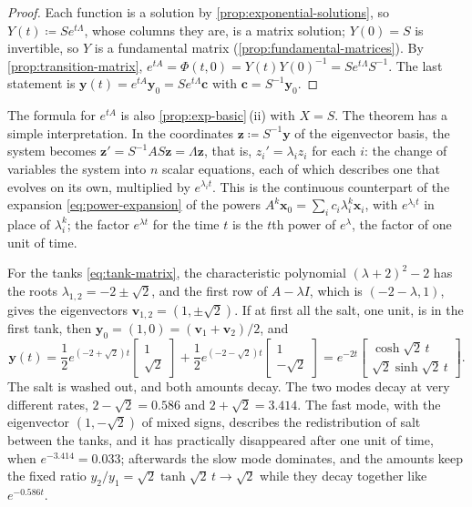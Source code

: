 \begin{proof}
Each function is a solution by \cref{prop:exponential-solutions}, so $Y(t)\coloneqq Se^{t\Lambda}$, whose columns they are, is a matrix solution; $Y(0)=S$ is invertible, so $Y$ is a fundamental matrix (\cref{prop:fundamental-matrices}). By \cref{prop:transition-matrix}, $e^{tA}=\Phi(t,0)=Y(t)Y(0)^{-1}=Se^{t\Lambda}S^{-1}$. The last statement is $\mathbf y(t)=e^{tA}\mathbf y_0=Se^{t\Lambda}\mathbf c$ with $\mathbf c=S^{-1}\mathbf y_0$.
\end{proof}

The formula for $e^{tA}$ is also \cref{prop:exp-basic}\,(ii) with $X=S$. The theorem has a simple interpretation. In the coordinates $\mathbf z\coloneqq S^{-1}\mathbf y$ of the eigenvector basis, the system becomes $\mathbf z'=S^{-1}AS\mathbf z=\Lambda\mathbf z$, that is, $z_i'=\lambda_iz_i$ for each $i$: the change of variables  the system into $n$ scalar equations, each of which describes one  that evolves on its own, multiplied by $e^{\lambda_it}$. This is the continuous counterpart of the expansion \eqref{eq:power-expansion} of the powers $A^k\mathbf x_0=\sum_ic_i\lambda_i^k\mathbf x_i$, with $e^{\lambda_it}$ in place of $\lambda_i^k$; the factor $e^{\lambda t}$ for the time $t$ is the $t$th power of $e^\lambda$, the factor of one unit of time.

For the tanks \eqref{eq:tank-matrix}, the characteristic polynomial $(\lambda+2)^2-2$ has the roots $\lambda_{1,2}=-2\pm\sqrt2$, and the first row of $A-\lambda I$, which is $(-2-\lambda,1)$, gives the eigenvectors $\mathbf v_{1,2}=(1,\pm\sqrt2)$. If at first all the salt, one unit, is in the first tank, then $\mathbf y_0=(1,0)=(\mathbf v_1+\mathbf v_2)/2$, and
\[
\mathbf y(t)=\frac12e^{(-2+\sqrt2)t}\begin{bmatrix}1\\\sqrt2\end{bmatrix}+\frac12e^{(-2-\sqrt2)t}\begin{bmatrix}1\\-\sqrt2\end{bmatrix}=e^{-2t}\begin{bmatrix}\cosh\sqrt2\,t\\\sqrt2\sinh\sqrt2\,t\end{bmatrix}.
\]
The salt is washed out, and both amounts decay. The two modes decay at very different rates, $2-\sqrt2=0.586$ and $2+\sqrt2=3.414$. The fast mode, with the eigenvector $(1,-\sqrt2)$ of mixed signs, describes the redistribution of salt between the tanks, and it has practically disappeared after one unit of time, when $e^{-3.414}=0.033$; afterwards the slow mode dominates, and the amounts keep the fixed ratio $y_2/y_1=\sqrt2\tanh\sqrt2\,t\to\sqrt2$ while they decay together like $e^{-0.586t}$.

